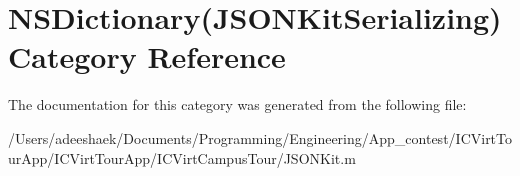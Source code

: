 \hypertarget{category_n_s_dictionary_07_j_s_o_n_kit_serializing_08}{\section{N\-S\-Dictionary(J\-S\-O\-N\-Kit\-Serializing) Category Reference}
\label{category_n_s_dictionary_07_j_s_o_n_kit_serializing_08}
}


The documentation for this category was generated from the following file\-:\begin{DoxyCompactItemize}
\item 
/\-Users/adeeshaek/\-Documents/\-Programming/\-Engineering/\-App\-\_\-contest/\-I\-C\-Virt\-Tour\-App/\-I\-C\-Virt\-Tour\-App/\-I\-C\-Virt\-Campus\-Tour/J\-S\-O\-N\-Kit.\-m\end{DoxyCompactItemize}

